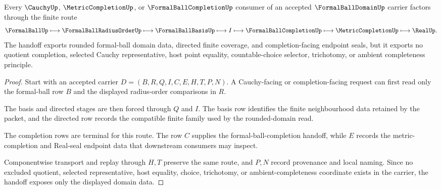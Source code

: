 \begin{theorem}\label{thm:formal-ball-domain-cauchy-completion-handoff}
Every $\CauchyUp$, $\MetricCompletionUp$, or $\FormalBallCompletionUp$ consumer of an accepted $\FormalBallDomainUp$ carrier factors through the finite route
$$
\FormalBallUp \longmapsto \FormalBallRadiusOrderUp \longmapsto \FormalBallBasisUp \longmapsto I \longmapsto \FormalBallCompletionUp \longmapsto \MetricCompletionUp \longmapsto \RealUp .
$$
The handoff exports rounded formal-ball domain data, directed finite coverage, and completion-facing endpoint seals, but it exports no quotient completion, selected Cauchy representative, host point equality, countable-choice selector, trichotomy, or ambient completeness principle.
\end{theorem}
\begin{proof}
Start with an accepted carrier $D=(B,R,Q,I,C,E,H,T,P,N)$. A Cauchy-facing or completion-facing request can first read only the formal-ball row $B$ and the displayed radius-order comparisons in $R$.

The basis and directed stages are then forced through $Q$ and $I$. The basis row identifies the finite neighbourhood data retained by the packet, and the directed row records the compatible finite family used by the rounded-domain read.

The completion rows are terminal for this route. The row $C$ supplies the formal-ball-completion handoff, while $E$ records the metric-completion and Real-seal endpoint data that downstream consumers may inspect.

Componentwise transport and replay through $H,T$ preserve the same route, and $P,N$ record provenance and local naming. Since no excluded quotient, selected representative, host equality, choice, trichotomy, or ambient-completeness coordinate exists in the carrier, the handoff exposes only the displayed domain data.
\end{proof}

